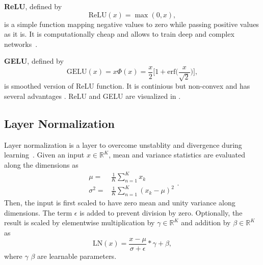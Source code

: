 \textbf{ReLU}, defined by
\begin{equation}
\label{eqn:relu_fcn}
\textrm{ReLU}(x) = \max(0, x),
\end{equation}
is a simple function mapping negative values to zero while passing positive values as it is. It is computationally cheap and allows to train deep and complex networks~\cite{glorot_deep_2011}.

\textbf{GELU}, defined by
\begin{equation}
\label{eqn:gelu_fcn}
\textrm{GELU}(x) = x \Phi(x) = \frac{x}{2} \bigg[ 1 + \textrm{erf} \Big( \frac{x}{\sqrt{2}} \Big) \bigg],
\end{equation}
is smoothed version of ReLU function. It is continious but non-convex and has several advantages \cite{hendrycks_gaussian_2020}. ReLU and GELU are visualized in  . 

\subsection{Layer Normalization}

Layer normalization is a layer to overcome unstablity and divergence during learning~\cite{ba_layer_2016}. 
Given an input $x \in \mathbb{R}^K$, mean and variance statistics are evaluated along the dimensions as  
\begin{equation}
\label{eq:layernorm_statistics}
\begin{split}
\mu = & \frac{1}{K} \sum_{n=1}^{K} x_k \\
\sigma^2 = & \frac{1}{K} \sum_{n=1}^{K} (x_k-\mu)^2
\end{split}.
\end{equation} 
Then, the input is first scaled to have zero mean and unity variance along dimensions. 
The term $\epsilon$ is added to prevent division by zero. 
Optionally, the result is scaled by elementwise multiplication by $\gamma \in \mathbb{R}^K$ and addition by $\beta \in \mathbb{R}^K$ as
\begin{equation}
\label{eqn:layernorm}
\mathrm{LN}(x) = \frac{x-\mu}{\sigma+\epsilon} * \gamma + \beta,
\end{equation}
where $\gamma$  $\beta$ are learnable parameters. 
